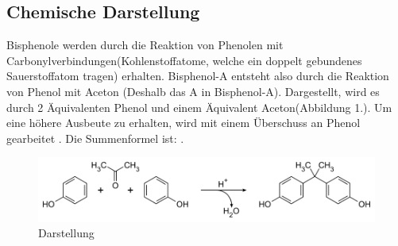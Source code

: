 \subsection{Chemische Darstellung}
Bisphenole werden durch die Reaktion von Phenolen mit Carbonylverbindungen(Kohlenstoffatome, welche ein doppelt gebundenes Sauerstoffatom tragen) erhalten. Bisphenol-A entsteht also durch die Reaktion von Phenol mit Aceton (Deshalb das \glqq A\grqq{} in Bisphenol-A). Dargestellt, wird es durch 2 Äquivalenten Phenol und einem Äquivalent Aceton(Abbildung 1.). Um eine höhere Ausbeute zu erhalten, wird mit einem Überschuss an Phenol gearbeitet \cite{Herstellung}. Die Summenformel ist: .\\
\begin{figure}[htpb]
    \centering
    \includegraphics[width=.75\textwidth]{Darstellung.png}
    \caption{Darstellung \cite{Wikipedia}}
\end{figure}
\newpage
